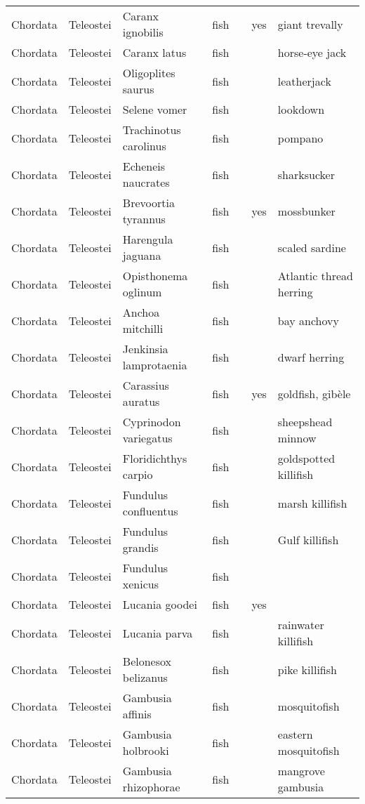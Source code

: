 \begin{longtable}{lllllll}
  Chordata & Teleostei & Caranx ignobilis & fish &  & yes & giant trevally \\ 
  Chordata & Teleostei & Caranx latus & fish &  &  & horse-eye jack \\ 
  Chordata & Teleostei & Oligoplites saurus & fish &  &  & leatherjack \\ 
  Chordata & Teleostei & Selene vomer & fish &  &  & lookdown \\ 
  Chordata & Teleostei & Trachinotus carolinus & fish &  &  & pompano \\ 
  Chordata & Teleostei & Echeneis naucrates & fish &  &  & sharksucker \\ 
  Chordata & Teleostei & Brevoortia tyrannus & fish &  & yes & mossbunker \\ 
  Chordata & Teleostei & Harengula jaguana & fish &  &  & scaled sardine \\ 
  Chordata & Teleostei & Opisthonema oglinum & fish &  &  & Atlantic thread herring \\ 
  Chordata & Teleostei & Anchoa mitchilli & fish &  &  & bay anchovy \\ 
  Chordata & Teleostei & Jenkinsia lamprotaenia & fish &  &  & dwarf herring \\ 
  Chordata & Teleostei & Carassius auratus & fish &  & yes & goldfish, gibèle \\ 
  Chordata & Teleostei & Cyprinodon variegatus & fish &  &  & sheepshead minnow \\ 
  Chordata & Teleostei & Floridichthys carpio & fish &  &  & goldspotted killifish \\ 
  Chordata & Teleostei & Fundulus confluentus & fish &  &  & marsh killifish \\ 
  Chordata & Teleostei & Fundulus grandis & fish &  &  & Gulf killifish \\ 
  Chordata & Teleostei & Fundulus xenicus & fish &  &  &  \\ 
  Chordata & Teleostei & Lucania goodei & fish &  & yes &  \\ 
  Chordata & Teleostei & Lucania parva & fish &  &  & rainwater killifish \\ 
  Chordata & Teleostei & Belonesox belizanus & fish &  &  & pike killifish \\ 
  Chordata & Teleostei & Gambusia affinis & fish &  &  & mosquitofish \\ 
  Chordata & Teleostei & Gambusia holbrooki & fish &  &  & eastern mosquitofish \\ 
  Chordata & Teleostei & Gambusia rhizophorae & fish &  &  & mangrove gambusia \\ 

\end{longtable}
